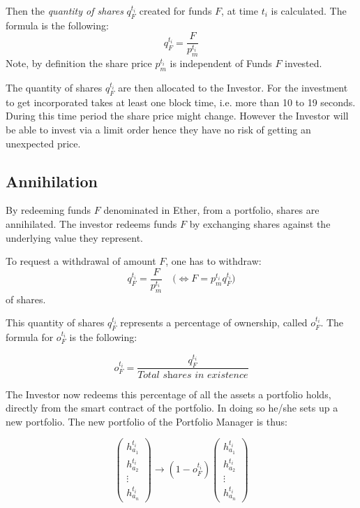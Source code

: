 \documentclass[9pt,oneside]{amsart}
\theoremstyle{plain}
\begin{document}
\begin{multicols}{2}
Then the \textit{quantity of shares} $q_{F}^{t_i}$ created for funds $F$, at time $t_i$ is calculated. The formula is the following:
\begin{equation}
	q_{F}^{t_i} = \frac{F}{p_{m}^{t_i}}
\end{equation}
Note, by definition the share price $p_{m}^{t_i}$ is independent of Funds $F$ invested.

The quantity of shares $q_{F}^{t_i}$ are then allocated to the Investor. For the investment to get incorporated takes at least one block time, i.e. more than 10 to 19 seconds. During this time period the share price might change. However the Investor will be able to invest via a limit order hence they have no risk of getting an unexpected price.

\subsection{Annihilation}\label{sub:annihilation}

By redeeming funds $F$ denominated in Ether, from a portfolio, shares are annihilated. The investor redeems funds $F$ by exchanging shares against the underlying value they represent.

To request a withdrawal of amount $F$, one has to withdraw:
\begin{equation}
	q_{F}^{t_i} = \frac{F}{p_{m}^{t_i}} \quad \big( \Leftrightarrow F = p_{m}^{t_i}q_{F}^{t_i} \big)
\end{equation}
of shares.

This quantity of shares $q_{F}^{t_i}$ represents a percentage of ownership, called $o_{F}^{t_i}$. The formula for $o_{F}^{t_i}$ is the following:

\begin{equation}
	o_{F}^{t_i} = \frac{q_{F}^{t_i}}{\textit{Total shares in existence}}
\end{equation}

The Investor now redeems this percentage of all the assets a portfolio holds, directly from the smart contract of the portfolio. In doing so he/she sets up a new portfolio. The new portfolio of the Portfolio Manager is thus:

\begin{equation*}
	\begin{pmatrix}
		h_{a_{1}}^{t_i}\\
		h_{a_{2}}^{t_i}\\
		\vdots \\
		h_{a_{n}}^{t_i}
	\end{pmatrix}
	\rightarrow
	(1 -
	o_{F}^{t_i})
	\begin{pmatrix}
		h_{a_{1}}^{t_i}\\
		h_{a_{2}}^{t_i}\\
		\vdots \\
		h_{a_{n}}^{t_i}
	\end{pmatrix}
\end{equation*}


\end{multicols}
\end{document}

